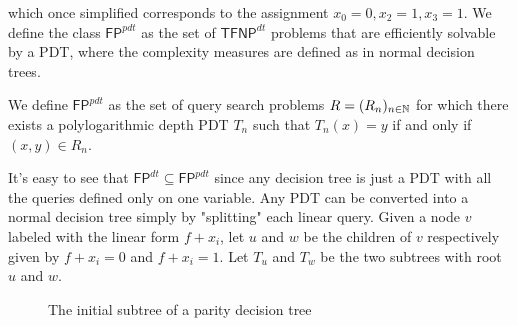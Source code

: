 which once simplified corresponds to the assignment $x_0 = 0, x_2 = 1, x_3 = 1$. We define the class $\mathsf{FP}^{pdt}$ as the set of $\mathsf{TFNP}^{dt}$ problems that are efficiently solvable by a PDT, where the complexity measures are defined as in normal decision trees.

\begin{definition}
 We define $\mathsf{FP}^{pdt}$ as the set of query search problems $R = (R_n)_{n \in \mathbb{N}}$ for which there exists a polylogarithmic depth PDT $T_n$ such that $T_n(x) = y$ if and only if $(x,y) \in R_n$.
\end{definition}

It's easy to see that $\mathsf{FP}^{dt} \subseteq \mathsf{FP}^{pdt}$ since any decision tree is just a PDT with all the queries defined only on one variable. Any PDT can be converted into a normal decision tree simply by "splitting" each linear query. Given a node $v$ labeled with the linear form $f + x_i$, let $u$ and $w$ be the children of $v$ respectively given by $f + x_i = 0$ and $f+x_i = 1$. Let $T_u$ and $T_w$ be the two subtrees with root $u$ and $w$.

\newpage

\begin{figure}[H]
    \centering


    \caption{The initial subtree of a parity decision tree}
\end{figure}

